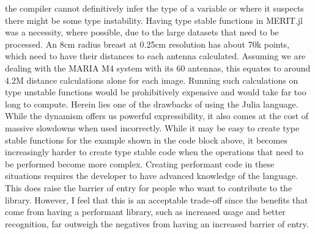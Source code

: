 the compiler cannot definitively infer the type of a variable or where it suspects there might be some type instability.
Having type stable functions in MERIT.jl was a necessity, where possible, due to the large datasets that need to be processed. An 8cm
radius breast at 0.25cm resolution has about 70k points, which need to have their distances to each antenna calculated.
Assuming we are dealing with the MARIA M4 system with its 60 antennas, this equates to around 4.2M distance calculations
alone for each image. Running such calculations on type unstable functions would be prohibitively expensive and would
take far too long to compute. Herein lies one of the drawbacks of using the Julia language. While the dynamism offers us
powerful expressibility, it also comes at the cost of massive slowdowns when used incorrectly. While it may be easy to
create type stable functions for the example shown in the code block above, it becomes increasingly harder to create
type stable code when the operations that need to be performed become more complex. Creating performant code in these
situations requires the developer to have advanced knowledge of the language. This does raise the barrier of entry for
people who want to contribute to the library. However, I feel that this is an acceptable trade-off since the benefits
that come from having a performant library, such as increased usage and better recognition, far outweigh the negatives
from having an increased barrier of entry.

